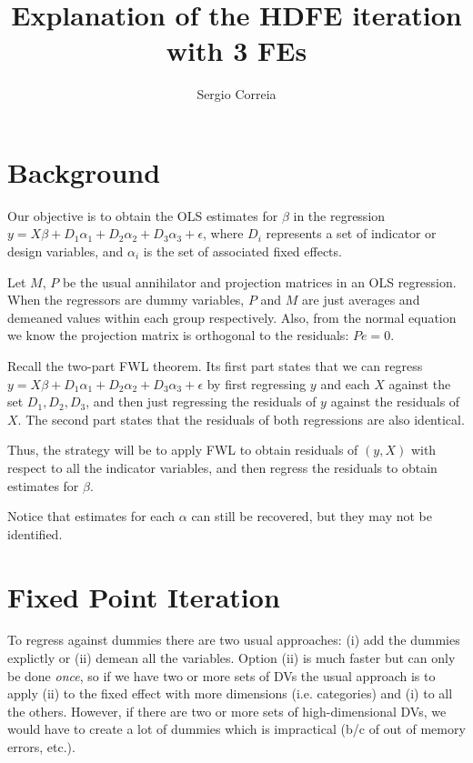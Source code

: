 \documentclass[11pt]{article}
\begin{document}
    \title{Explanation of the HDFE iteration with 3 FEs}
  \author{Sergio Correia}
    
\maketitle

\section{Background}

Our objective is to obtain the OLS estimates for $\beta$ in the regression $y = X\beta + D_1\alpha_1 + D_2\alpha_2 + D_3\alpha_3 + \epsilon$, where $D_i$ represents a set of indicator or design variables, and $\alpha_i$ is the set of associated fixed effects.

Let $M$, $P$ be the usual annihilator and projection matrices in an OLS regression. When the regressors are dummy variables, $P$ and $M$ are just averages and demeaned values within each group respectively. Also, from the normal equation we know the projection matrix is orthogonal to the residuals: $Pe=0$.

Recall the two-part FWL theorem. Its first part states that we can regress $y = X\beta + D_1\alpha_1 + D_2\alpha_2 + D_3\alpha_3 + \epsilon$ by first regressing $y$ and each $X$ against the set $D_1, D_2, D_3$, and then just regressing the residuals of $y$ against the residuals of $X$. The second part states that the residuals of both regressions are also identical.

Thus, the strategy will be to apply FWL to obtain residuals of $(y,X)$ with respect to all the indicator variables, and then regress the residuals to obtain estimates for $\beta$.

Notice that estimates for each $\alpha$ can still be recovered, but they may not be identified.

\section{Fixed Point Iteration}

To regress against dummies there are two usual approaches: (i) add the dummies explictly or (ii) demean all the variables. Option (ii) is much faster but can only be done \textit{once}, so if we have two or more sets of DVs the usual approach is to apply (ii) to the fixed effect with more dimensions (i.e. categories) and (i) to all the others. However, if there are two or more sets of high-dimensional DVs, we would have to create a lot of dummies which is impractical (b/c of out of memory errors, etc.).
\end{document}

